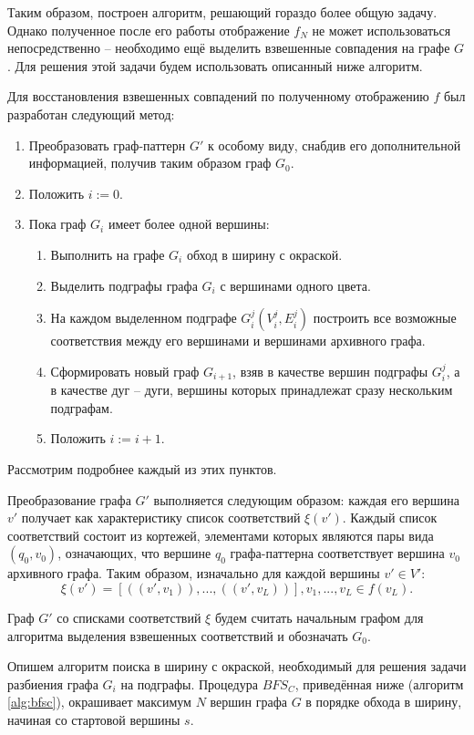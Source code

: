 Таким образом, построен алгоритм, решающий гораздо более общую задачу. Однако полученное после его работы отображение $f_N$ не может использоваться непосредственно -- необходимо ещё выделить взвешенные совпадения на графе $G$. Для решения этой задачи будем использовать описанный ниже алгоритм.

Для восстановления взвешенных совпадений по полученному отображению $f$ был разработан следующий метод:

\begin{enumerate}
	\item Преобразовать граф-паттерн $G'$ к особому виду, снабдив его дополнительной информацией, получив таким образом граф $G_0$.
	\item Положить $i := 0$.
	\item Пока граф $G_i$ имеет более одной вершины:
	\begin{enumerate}
		\item Выполнить на графе $G_i$ обход в ширину с окраской.
		\item Выделить подграфы графа $G_i$ с вершинами одного цвета.
		\item На каждом выделенном подграфе $G_i^j(V_i^j, E_i^j)$ построить все возможные соответствия между его вершинами и вершинами архивного графа.
		\item Сформировать новый граф $G_{i+1}$, взяв в качестве вершин подграфы $G_i^j$, а в качестве дуг -- дуги, вершины которых принадлежат сразу нескольким подграфам.
		\item Положить $i := i + 1$.
	\end{enumerate}
\end{enumerate}

Рассмотрим подробнее каждый из этих пунктов.

Преобразование графа $G'$ выполняется следующим образом: каждая его вершина $v'$ получает как характеристику список соответствий $\xi(v')$. Каждый список соответствий состоит из кортежей, элементами которых являются пары вида $(q_0, v_0)$, означающих, что вершине $q_0$ графа-паттерна соответствует вершина $v_0$ архивного графа. Таким образом, изначально для каждой вершины $v' \in V'$:
\[\xi(v') = [((v', v_1)), ..., ((v', v_L))], v_1, ..., v_L \in f(v_L).\]

Граф $G'$ со списками соответствий $\xi$ будем считать начальным графом для алгоритма выделения взвешенных соответствий и обозначать $G_0$.

Опишем алгоритм поиска в ширину с окраской, необходимый для решения задачи разбиения графа $G_i$ на подграфы. Процедура $BFS_C$, приведённая ниже (алгоритм \ref{alg:bfsc}), окрашивает максимум $N$ вершин графа $G$ в порядке обхода в ширину, начиная со стартовой вершины $s$.


